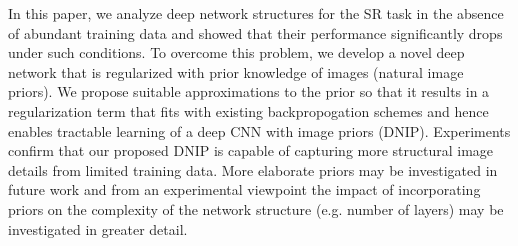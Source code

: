 \documentclass[9pt]{article}
\begin{document}
In this paper, we analyze deep network structures for the SR task in the absence of abundant training data and showed that their performance significantly drops under such conditions. To overcome this problem, we develop a novel deep network that is regularized with prior knowledge of images (natural image priors). We propose suitable approximations to the prior so that it results in a regularization term that fits with existing backpropogation schemes and hence enables tractable learning of a deep CNN with image priors (DNIP). Experiments confirm that our proposed DNIP is capable of capturing more structural image details from limited training data. More elaborate priors may be investigated in future work and from an experimental viewpoint the impact of incorporating priors on the complexity of the network structure (e.g. number of layers) may be investigated in greater detail.


%






\vfill\pagebreak

\small



\end{document}

